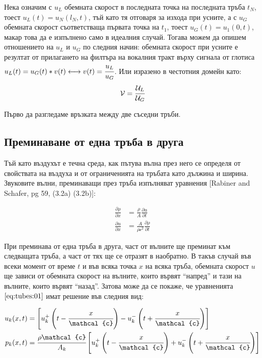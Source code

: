\documentclass[12pt]{report}
\numberwithin{equation}{section}
\numberwithin{figure}{section}
\newcommand{\B}[1]{\left(#1\right)}
\newcommand{\Q}[1]{\left[#1\right]}
\begin{document}
    Нека означим с $u_L$ обемната скорост в последната точка на последната тръба $t_N$, тоест $u_L(t) = u_N(l_N, t)$, тъй като тя отговаря за изхода при усните, 
    а с $u_G$ обемната скорост съответстваща първата точка на $t_1$, тоест $u_G(t) = u_1(0, t)$, макар това да е изпълнено само в идеалния случай.
    Тогава можем да опишем отношението на $u_L$ и $u_G$ по следния начин: обемната скорост при усните е резултат от прилагането на филтъра на вокалния тракт върху сигнала
    от глотиса  $u_L(t) = u_G(t)\ast v(t) \longleftrightarrow v(t) = \cfrac{u_L}{u_G}$.
    Или изразено в честотния домейн като:
    \[
        \mathcal{V} = \cfrac{\mathcal{U}_L}{\mathcal{U}_G}
    \]

    Първо да разгледаме връзката между две съседни тръби.
    
    \subsection{Преминаване от една тръба в друга}

    Тъй като въздухът е течна среда, как пътува вълна през него се определя от свойствата на въздуха и от ограниченията на тръбата като дължина и ширина. Звуковите вълни, преминаващи през
    тръба изпълняват уравнения [Rabiner and Schafer, pg 59, (3.2a) (3.2b)]:
    
    \begin{subequations}
        \label{eq:tubes:01}
        \begin{align}
            \label{eq:tubes:01:a} \frac{\partial\rho}{\partial x} & = \frac{\rho}{A} \frac{\partial u}{\partial t}\\
            \label{eq:tubes:01:b} \frac{\partial u}{\partial x} & = \frac{A}{\rho \mathcal{c}^2} \frac{\partial \rho}{\partial t}
        \end{align}
    \end{subequations}

    При преминава от една тръба в друга, част от вълните ще преминат към следващата тръба, а част от тях ще се отразят в наобратно.
    В такъв случай във всеки момент от време $t$ и във всяка точка $x$ на всяка тръба,
    обемната скорост $u$ ще зависи от обемната скорост на вълните,
    които вървят ``напред'' и тази на вълните, които вървят ``назад''.
    Затова може да се покаже, че уравненията $\eqref{eq:tubes:01}$ имат решение във следния вид:

    \begin{subequations}
        \label{eq:tubes:02}
        \begin{align}
            u_{k}(x, t) & = \Q{u_{k}^{+}\B{t - \cfrac{x}{\mathcal{c}}} - u_{k}^{-}\B{t + \cfrac{x}{\mathcal{c}}}}\\
            p_{k}(x, t) & = \cfrac{\rho \mathcal{c}}{A_{k}} \Q{u_{k}^{+}\B{t - \cfrac{x}{\mathcal{c}}} + u_{k}^{-}\B{t + \cfrac{x}{\mathcal{c}}}}
        \end{align}
    \end{subequations}
\end{document}
